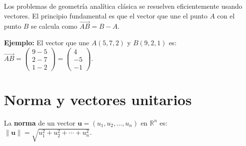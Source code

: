 Los problemas de geometría analítica clásica se resuelven eficientemente usando vectores. El principio fundamental es que el vector que une el punto $A$ con el punto $B$ se calcula como $\overrightarrow{AB} = B - A$.

\textbf{Ejemplo:} El vector que une $A(5,7,2)$ y $B(9,2,1)$ es:$\overrightarrow{AB} = \begin{pmatrix} 9-5 \\ 2-7 \\ 1-2 \end{pmatrix} = \begin{pmatrix} 4 \\ -5 \\ -1 \end{pmatrix}.$

\section{Norma y vectores unitarios}

\begin{definition}
La \textbf{norma} de un vector $\mathbf{u} = (u_1, u_2, \ldots, u_n)$ en $\mathbb{R}^n$ es: $\|\mathbf{u}\| = \sqrt{u_1^2 + u_2^2 + \cdots + u_n^2}.$
\end{definition}

